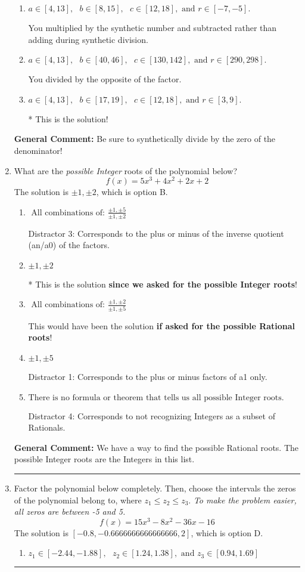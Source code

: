 \documentclass{extbook}[14pt]
\newcommand{\litem}[1]{\item #1

\rule{\textwidth}{0.4pt}}
\begin{document}
\begin{enumerate}
{\begin{enumerate}[label=\Alph*.]
 You divided by the opposite of the factor AND multiplied the first factor rather than just bringing it down.
\item \( a \in [4, 13], \text{   } b \in [8, 15], \text{   } c \in [12, 18], \text{   and   } r \in [-7, -5]. \)

 You multiplied by the synthetic number and subtracted rather than adding during synthetic division.
\item \( a \in [4, 13], \text{   } b \in [40, 46], \text{   } c \in [130, 142], \text{   and   } r \in [290, 298]. \)

 You divided by the opposite of the factor.
\item \( a \in [4, 13], \text{   } b \in [17, 19], \text{   } c \in [12, 18], \text{   and   } r \in [3, 9]. \)

* This is the solution!
\end{enumerate}

\textbf{General Comment:} Be sure to synthetically divide by the zero of the denominator!
}
\litem{
What are the \textit{possible Integer} roots of the polynomial below?
\[ f(x) = 5x^{3} +4 x^{2} +2 x + 2 \]The solution is \( \pm 1,\pm 2 \), which is option B.\begin{enumerate}[label=\Alph*.]
\item \( \text{ All combinations of: }\frac{\pm 1,\pm 5}{\pm 1,\pm 2} \)

 Distractor 3: Corresponds to the plus or minus of the inverse quotient (an/a0) of the factors. 
\item \( \pm 1,\pm 2 \)

* This is the solution \textbf{since we asked for the possible Integer roots}!
\item \( \text{ All combinations of: }\frac{\pm 1,\pm 2}{\pm 1,\pm 5} \)

This would have been the solution \textbf{if asked for the possible Rational roots}!
\item \( \pm 1,\pm 5 \)

 Distractor 1: Corresponds to the plus or minus factors of a1 only.
\item \( \text{There is no formula or theorem that tells us all possible Integer roots.} \)

 Distractor 4: Corresponds to not recognizing Integers as a subset of Rationals.
\end{enumerate}

\textbf{General Comment:} We have a way to find the possible Rational roots. The possible Integer roots are the Integers in this list.
}
\litem{
Factor the polynomial below completely. Then, choose the intervals the zeros of the polynomial belong to, where $z_1 \leq z_2 \leq z_3$. \textit{To make the problem easier, all zeros are between -5 and 5.}
\[ f(x) = 15x^{3} -8 x^{2} -36 x -16 \]The solution is \( [-0.8, -0.6666666666666666, 2] \), which is option D.\begin{enumerate}[label=\Alph*.]
\item \( z_1 \in [-2.44, -1.88], \text{   }  z_2 \in [1.24, 1.38], \text{   and   } z_3 \in [0.94, 1.69] \)


\end{enumerate}}
\end{enumerate}
\end{document}
